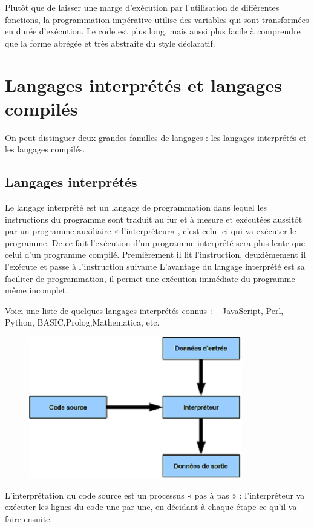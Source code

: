 \documentclass[a4paper,12pt]{article} %
\begin{document}
Plutôt que de laisser une marge d’exécution par l’utilisation de différentes fonctions, la programmation impérative utilise des variables qui sont transformées en durée d’exécution. Le code est plus long, mais aussi plus facile à comprendre que la forme abrégée et très abstraite du style déclaratif.

\section{Langages interprétés et langages compilés}

On peut distinguer deux grandes familles de langages : les langages interprétés et les langages compilés.

\subsection{Langages interprétés}
Le langage interprété est un langage de programmation dans lequel les instructions du programme sont traduit au fur et à mesure et exécutées aussitôt par un programme auxiliaire « l’interpréteur« , c’est celui-ci qui va exécuter le programme.
De ce fait l’exécution d’un programme interprété sera plus lente que celui d’un programme compilé.
Premièrement il lit l’instruction, deuxièmement il l’exécute et passe à l’instruction suivante
L’avantage du langage interprété est sa faciliter de programmation, il permet une exécution immédiate du programme même incomplet.

Voici une liste de quelques langages interprétés connus : – JavaScript, Perl, Python, BASIC,Prolog,Mathematica, etc.
\begin{figure}[h] %
  \centering %
  \includegraphics[scale=1]{interprete.png} %
\end{figure}

L'interprétation du code source est un processus « pas à pas » : l'interpréteur va exécuter les lignes du code une par une, en décidant à chaque étape ce qu'il va faire ensuite.
\end{document}
